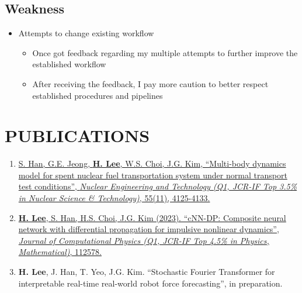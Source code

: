 \documentclass[a4paper,10pt]{extarticle}
\begin{document}
\subsection*{Weakness}
\begin{itemize}
    \item Attempts to change existing workflow
          \begin{itemize}
              \item Once got feedback regarding my multiple attempts to further improve the established workflow
              \item After receiving the feedback, I pay more caution to better respect established procedures and pipelines
          \end{itemize}
\end{itemize}

\section*{PUBLICATIONS}
\noindent
\begin{enumerate}[leftmargin=.5cm]
	\item \href{https://www.google.com/url?sa=t&rct=j&q=&esrc=s&source=web&cd=&cad=rja&uact=8&ved=2ahUKEwij36zWpNKCAxXMMEQIHSBfBMUQFnoECBEQAQ&url=https%3A%2F%2Fwww.sciencedirect.com%2Fscience%2Farticle%2Fpii%2FS1738573323003492&usg=AOvVaw1zj_G3k5c77uhMNnmu0EEC&opi=89978449}{S. Han, G.E. Jeong, \textbf{H. Lee}, W.S. Choi, J.G. Kim, “Multi-body dynamics model for spent nuclear fuel transportation system under normal transport test conditions”, \textit{Nuclear Engineering and Technology (Q1, JCR-IF Top 3.5\% in Nuclear Science \& Technology)}, 55(11), 4125-4133.}
	\item \href{https://www.sciencedirect.com/science/article/pii/S0021999123006733?casa_token=ARUkhI8XI8YAAAAA:wTzCIauJvSlonWw-J-SlAFqPX6NZRQS-qBX59l4YN5O3caEppoglU0duVmMkZYf4nWYd7tm_D_E}{\textbf{H. Lee}, S. Han, H.S. Choi, J.G. Kim (2023). “cNN-DP: Composite neural network with differential propagation for impulsive nonlinear dynamics”, \textit{Journal of Computational Physics (Q1, JCR-IF Top 4.5\% in Physics, Mathematical)}, 112578.}
	\item \textbf{H. Lee}, J. Han, T. Yeo, J.G. Kim. “Stochastic Fourier Transformer for interpretable real-time real-world robot force forecasting”, in preparation.
\end{enumerate}

\end{document}
